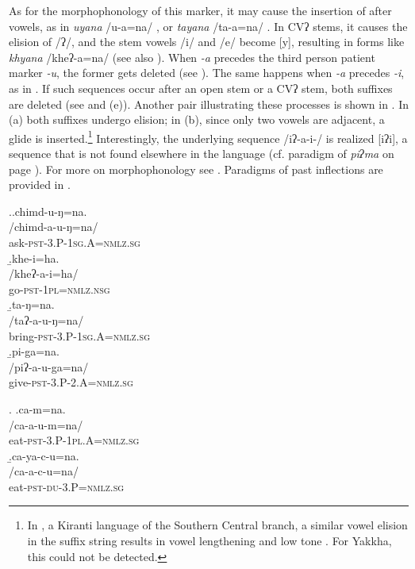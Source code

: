 As for the morphophonology of this marker, it may cause the insertion of  after vowels, as in \emph{uyana} /u-a=na/ , or \emph{tayana} /ta-a=na/ . In CVʔ stems, it causes the elision of /ʔ/, and the stem vowels /i/ and /e/ become [y], resulting in forms like   \emph{khyana} /kheʔ-a=na/  (see also \Last[a]).  When \emph{-a} precedes the third person patient marker \emph{-u}, the former gets deleted (see \Next[a]). The same happens when \emph{-a} precedes \emph{-i}, as in \Next[b]. If such sequences occur after an open stem or a CVʔ stem, both suffixes are deleted (see \Next[c] and (e)). Another pair illustrating these processes is shown in \NNext. In (a) both suffixes undergo elision; in (b), since only two vowels are adjacent, a glide is inserted.\footnote{In , a Kiranti language of the Southern Central branch, a similar vowel elision in the suffix string results in vowel lengthening and low tone \citep{Bickeletal2006The-Chintang}. For Yakkha, this could not be detected.} Interestingly, the underlying sequence /iʔ-a-i-/ is realized [iʔi], a sequence that is not found elsewhere in the language (cf. paradigm of \emph{piʔma}  on page \pageref{par-pipma-pst}). For more on morphophonology see . Paradigms of past inflections are provided in .

\ex.\a.\glll chimd-u-ŋ=na.\\
 /chimd-a-u-ŋ=na/\\
ask{\scshape -pst-3.P-1sg.A=nmlz.sg}\\
\b.\glll khe-i=ha.\\
 /kheʔ-a-i=ha/\\
go{\scshape -pst-1pl=nmlz.nsg}\\
\b.\glll ta-ŋ=na.\\
/taʔ-a-u-ŋ=na/\\
bring{\scshape -pst-3.P-1sg.A=nmlz.sg}\\
\b.\glll pi-ga=na.\\
/piʔ-a-u-ga=na/\\
give{\scshape -pst-3.P-2.A=nmlz.sg}\\

\ex. \a.\glll ca-m=na.\\
 /ca-a-u-m=na/\\
eat{\scshape -pst-3.P-1pl.A=nmlz.sg}\\
\b.\glll ca-ya-c-u=na.\\
/ca-a-c-u=na/\\
eat{\scshape -pst-du-3.P=nmlz.sg}\\


